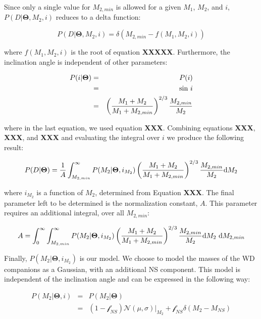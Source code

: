 \documentclass[letterpaper,12pt,preprint]{aastex}
\begin{document}
Since only a single value for $M_{2,min}$ is allowed for a given $M_1$, $M_2$, and $i$, $P(D | \mathbf{\Theta}, M_2, i)$ reduces to a delta function:

\begin{equation}
P(D | \mathbf{\Theta}, M_2, i) = \delta \left(M_{2,min} - f(M_1,M_2,i) \right)
\end{equation}

where $f(M_1,M_2,i)$ is the root of equation {\bf XXXXX}. Furthermore, the inclination angle is independent of other parameters:

\begin{eqnarray}
P(i | \mathbf{\Theta}) &=& P(i) \\
  &=& {\rm sin}\ i \\
  &=& \left( \frac{M_1 + M_2}{M_1 + M_{2,min}} \right)^{2/3} \frac{M_{2,min}}{M_2}
\end{eqnarray}

where in the last equation, we used equation {\bf XXX}. Combining equations {\bf XXX}, {\bf XXX}, and {\bf XXX} and evaluating the integral over $i$ we produce the following result:

\begin{equation}
P(D|\mathbf{\Theta}) = \frac{1}{A} \int_{M_{2,min}}^{\infty}  P(M_2|\mathbf{\Theta},i_{M_2}) \left( \frac{M_1 + M_2}{M_1 + M_{2,min}} \right)^{2/3} \frac{M_{2,min}}{M_2} {\rm d}M_2
\end{equation}

where $i_{M_2}$ is a function of $M_2$, determined from Equation {\bf XXX}. The final parameter left to be determined is the normalization constant, $A$. This parameter requires an additional integral, over all $M_{2,min}$:

\begin{equation}
A = \int_0^{\infty} \int_{M_{2,min}}^{\infty} P(M_2|\mathbf{\Theta}, i_{M_2}) \left( \frac{M_1 + M_2}{M_1 + M_{2,min}} \right)^{2/3} \frac{M_{2,min}}{M_2} {\rm d}M_2\ {\rm d}M_{2,min}
\end{equation}


Finally, $P(M_2|\mathbf{\Theta},i_{M_2})$ is our model. We choose to model the masses of the WD companions as a Gaussian, with an additional NS component. This model is independent of the inclination angle and can be expressed in the following way:

\begin{eqnarray}
P(M_2|\mathbf{\Theta},i) &=& P(M_2 | \mathbf{\Theta}) \\
  &=& \left( 1-\mathcal{f}_{NS} \right) \mathcal{N}(\mu , \sigma)|_{M_2} + \mathcal{f}_{NS} \delta \left( M_2 - M_{NS} \right)
\end{eqnarray}
\end{document}

